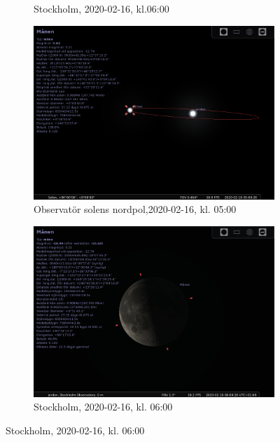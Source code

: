 \documentclass[./exercises.tex]{subfiles}
\begin{document}
\begin{itemize}
\begin{figure}[H]
\begin{subfigure}[b]{0.45\textwidth}
         \caption{Stockholm, 2020-02-16, kl.06:00 }
         \label{fig:three sin x}
     \end{subfigure}
     \hfill
     \begin{subfigure}[b]{0.45\textwidth}
         \centering
         \includegraphics[width=\textwidth]{Stellarium1/WXGib/stellarium-002.png}
         \caption{Observatör solens nordpol,2020-02-16, kl. 05:00}
         \label{fig:three sin x}
     \end{subfigure}
     \hfill
     \begin{subfigure}[b]{0.45\textwidth}
         \centering
         \includegraphics[width=\textwidth]{Stellarium1/WXGib/stellarium-003.png}
         \caption{Stockholm, 2020-02-16, kl. 06:00}
         \label{fig:three sin x}
     \end{subfigure}

\end{figure}
\end{itemize}
\end{document}
